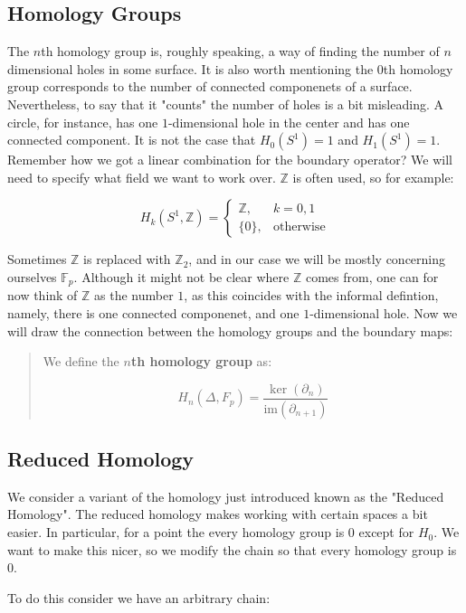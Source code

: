 \documentclass[letterpaper,12pt]{article}
\begin{document}
\subsection{Homology Groups}

The $n$th homology group is, roughly speaking, a way of finding the number of $n$ dimensional holes in some surface. It is also worth mentioning the $0$th homology group corresponds to the number of connected componenets of a surface. Nevertheless, to say that it "counts" the number of holes is a bit misleading. A circle, for instance, has one $1$-dimensional hole in the center and has one connected component. It is not the case that $H_0(S^1) = 1$ and $H_1(S^1) = 1$. Remember how we got a linear combination for the boundary operator? We will need to specify what field we want to work over. $\mathbb{Z}$ is often used, so for example:

$$H_k(S^1, \mathbb{Z}) =
\begin{cases}
    \mathbb{Z}, & k = 0, 1 \\
    \{ 0 \}, & \text{otherwise}
\end{cases}
$$

Sometimes $\mathbb{Z}$ is replaced with $\mathbb{Z}_2$, and in our case we will be mostly concerning ourselves $\mathbb{F}_p$. Although it might not be clear where $\mathbb{Z}$ comes from, one can for now think of $\mathbb{Z}$ as the number $1$, as this coincides with the informal defintion, namely, there is one connected componenet, and one $1$-dimensional hole. Now we will draw the connection between the homology groups and the boundary maps:

\begin{quote}
    We define the $n$\textbf{th homology group} as:

    $$H_n(\Delta, F_p) = \frac{\ker(\partial_n)}{\text{im}(\partial_{n+1})}$$
\end{quote}

\subsection{Reduced Homology}

We consider a variant of the homology just introduced known as the "Reduced Homology". The reduced homology makes working with certain spaces a bit easier. In particular, for a point the every homology group is $0$ except for $H_0$. We want to make this nicer, so we modify the chain so that every homology group is $0$.

To do this consider we have an arbitrary chain:
\end{document}

